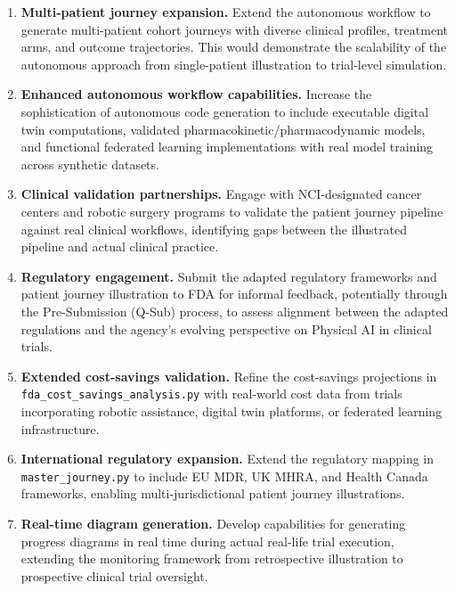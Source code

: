 \documentclass{article}
\begin{document}
\begin{enumerate}[leftmargin=*]
\item \textbf{Multi-patient journey expansion.} Extend the autonomous workflow to generate multi-patient cohort journeys with diverse clinical profiles, treatment arms, and outcome trajectories. This would demonstrate the scalability of the autonomous approach from single-patient illustration to trial-level simulation.

\item \textbf{Enhanced autonomous workflow capabilities.} Increase the sophistication of autonomous code generation to include executable digital twin computations, validated pharmacokinetic/pharmacodynamic models, and functional federated learning implementations with real model training across synthetic datasets.

\item \textbf{Clinical validation partnerships.} Engage with NCI-designated cancer centers and robotic surgery programs to validate the patient journey pipeline against real clinical workflows, identifying gaps between the illustrated pipeline and actual clinical practice.

\item \textbf{Regulatory engagement.} Submit the adapted regulatory frameworks and patient journey illustration to FDA for informal feedback, potentially through the Pre-Submission (Q-Sub) process, to assess alignment between the adapted regulations and the agency's evolving perspective on Physical AI in clinical trials.

\item \textbf{Extended cost-savings validation.} Refine the cost-savings projections in \texttt{fda\_cost\_savings\_analysis.py} with real-world cost data from trials incorporating robotic assistance, digital twin platforms, or federated learning infrastructure.

\item \textbf{International regulatory expansion.} Extend the regulatory mapping in \texttt{master\_journey.py} to include EU MDR, UK MHRA, and Health Canada frameworks, enabling multi-jurisdictional patient journey illustrations.

\item \textbf{Real-time diagram generation.} Develop capabilities for generating progress diagrams in real time during actual real-life trial execution, extending the monitoring framework from retrospective illustration to prospective clinical trial oversight.
\end{enumerate}
\end{document}
